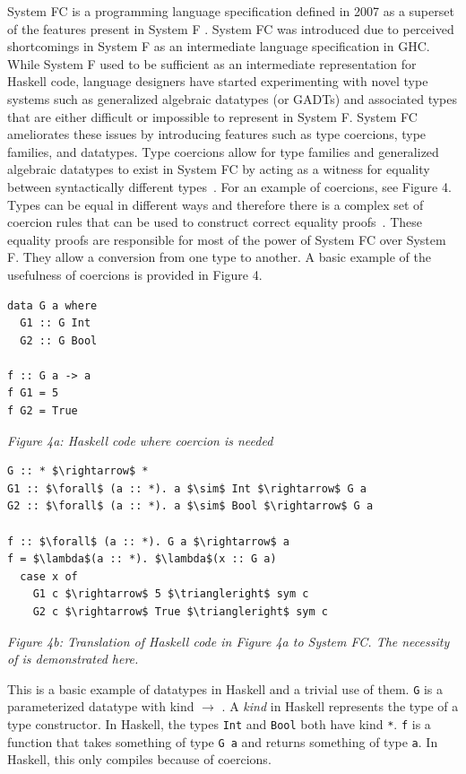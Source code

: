 \documentclass{sig-alternate}
\begin{document}
System FC is a programming language specification defined in 2007 as a superset of the features present in System F \cite{conf/tldi/SulzmannCJD07}. System FC was introduced due to perceived shortcomings in System F as an intermediate language specification in GHC. While System F used to be sufficient as an intermediate representation for Haskell code, language designers have started experimenting with novel type systems such as generalized algebraic datatypes (or GADTs) and associated types that are either difficult or impossible to represent in System F. System FC ameliorates these issues by introducing features such as type coercions, type families, and datatypes. 
Type coercions allow for type families and generalized algebraic datatypes to exist in System FC by acting as a witness for equality between syntactically different types~\cite{DBLP:conf/rta/VytiniotisJ13}. For an example of coercions, see Figure 4. Types can be equal in different ways and therefore there is a complex set of coercion rules that can be used to construct correct equality proofs~\cite{Breitner:2014:SZC:2628136.2628141}. These equality proofs are responsible for most of the power of System FC over System F. They allow a conversion from one type to another. A basic example of the usefulness of coercions is provided in Figure 4.
\begin{verbatim}
data G a where
  G1 :: G Int
  G2 :: G Bool

f :: G a -> a
f G1 = 5
f G2 = True
\end{verbatim}
\begin{center}
\it Figure 4a: Haskell code where coercion is needed
\end{center}


\begin{lstlisting}
G :: * $\rightarrow$ *
G1 :: $\forall$ (a :: *). a $\sim$ Int $\rightarrow$ G a
G2 :: $\forall$ (a :: *). a $\sim$ Bool $\rightarrow$ G a

f :: $\forall$ (a :: *). G a $\rightarrow$ a
f = $\lambda$(a :: *). $\lambda$(x :: G a)
  case x of
    G1 c $\rightarrow$ 5 $\triangleright$ sym c
    G2 c $\rightarrow$ True $\triangleright$ sym c
\end{lstlisting}
\begin{center}
\it Figure 4b: Translation of Haskell code in Figure 4a to System FC. The necessity of is demonstrated here.
\end{center}

This is a basic example of datatypes in Haskell and a trivial use of them. \texttt{G} is a parameterized datatype with kind {\tt *} $\rightarrow$ {\tt *}. A \textit{kind} in Haskell represents the type of a type constructor. In Haskell, the types \texttt{Int} and \texttt{Bool} both have kind \texttt{*}. \texttt{f} is a function that takes something of type \texttt{G a} and returns something of type \texttt{a}. In Haskell, this only compiles because of coercions.
\end{document}
